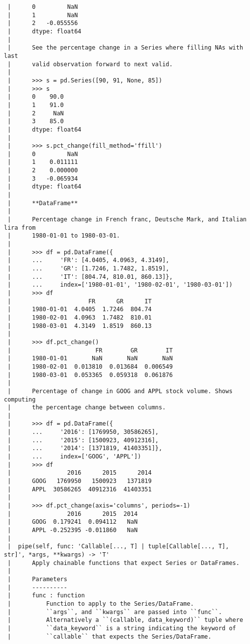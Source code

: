 \documentclass[
  letterpaper,
  DIV=11,
  numbers=noendperiod]{scrreprt}
\begin{document}
\begin{verbatim}
 |      0         NaN
 |      1         NaN
 |      2   -0.055556
 |      dtype: float64
 |      
 |      See the percentage change in a Series where filling NAs with last
 |      valid observation forward to next valid.
 |      
 |      >>> s = pd.Series([90, 91, None, 85])
 |      >>> s
 |      0    90.0
 |      1    91.0
 |      2     NaN
 |      3    85.0
 |      dtype: float64
 |      
 |      >>> s.pct_change(fill_method='ffill')
 |      0         NaN
 |      1    0.011111
 |      2    0.000000
 |      3   -0.065934
 |      dtype: float64
 |      
 |      **DataFrame**
 |      
 |      Percentage change in French franc, Deutsche Mark, and Italian lira from
 |      1980-01-01 to 1980-03-01.
 |      
 |      >>> df = pd.DataFrame({
 |      ...     'FR': [4.0405, 4.0963, 4.3149],
 |      ...     'GR': [1.7246, 1.7482, 1.8519],
 |      ...     'IT': [804.74, 810.01, 860.13]},
 |      ...     index=['1980-01-01', '1980-02-01', '1980-03-01'])
 |      >>> df
 |                      FR      GR      IT
 |      1980-01-01  4.0405  1.7246  804.74
 |      1980-02-01  4.0963  1.7482  810.01
 |      1980-03-01  4.3149  1.8519  860.13
 |      
 |      >>> df.pct_change()
 |                        FR        GR        IT
 |      1980-01-01       NaN       NaN       NaN
 |      1980-02-01  0.013810  0.013684  0.006549
 |      1980-03-01  0.053365  0.059318  0.061876
 |      
 |      Percentage of change in GOOG and APPL stock volume. Shows computing
 |      the percentage change between columns.
 |      
 |      >>> df = pd.DataFrame({
 |      ...     '2016': [1769950, 30586265],
 |      ...     '2015': [1500923, 40912316],
 |      ...     '2014': [1371819, 41403351]},
 |      ...     index=['GOOG', 'APPL'])
 |      >>> df
 |                2016      2015      2014
 |      GOOG   1769950   1500923   1371819
 |      APPL  30586265  40912316  41403351
 |      
 |      >>> df.pct_change(axis='columns', periods=-1)
 |                2016      2015  2014
 |      GOOG  0.179241  0.094112   NaN
 |      APPL -0.252395 -0.011860   NaN
 |  
 |  pipe(self, func: 'Callable[..., T] | tuple[Callable[..., T], str]', *args, **kwargs) -> 'T'
 |      Apply chainable functions that expect Series or DataFrames.
 |      
 |      Parameters
 |      ----------
 |      func : function
 |          Function to apply to the Series/DataFrame.
 |          ``args``, and ``kwargs`` are passed into ``func``.
 |          Alternatively a ``(callable, data_keyword)`` tuple where
 |          ``data_keyword`` is a string indicating the keyword of
 |          ``callable`` that expects the Series/DataFrame.

\end{verbatim}
\end{document}
